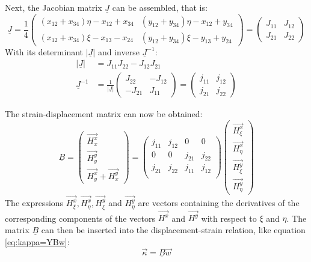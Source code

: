   Next, the Jacobian matrix $\underline{J}$ can be assembled, that is:
  \begin{equation}
  \underline{J} = \frac{1}{4} \begin{pmatrix}
  (x_{12}+x_{34})\eta - x_{12} + x_{34} & (y_{12} + y_{34})\eta - x_{12} + y_{34}\\
  (x_{12}+x_{34})\xi  - x_{13} - x_{24} & (y_{12} + y_{34})\xi  - y_{13} + y_{24}
  \end{pmatrix} = \begin{pmatrix}
  J_{11} & J_{12}\\ J_{21} & J_{22}
  \end{pmatrix}
  \end{equation}
  With its determinant $\left|\underline{J}\right|$ and inverse $\underline{J}^{-1}$:
  \begin{align}
  \left|\underline{J}\right| &= J_{11} J_{22} - J_{12} J_{21}\\
  \underline{J}^{-1} &= \frac{1}{\left|\underline{J}\right|} \begin{pmatrix}
  J_{22} & -J_{12}\\ -J_{21} & J_{11}
  \end{pmatrix} = \begin{pmatrix}
  j_{11} & j_{12}\\ j_{21} & j_{22}
  \end{pmatrix}
  \end{align}
  
  The strain-displacement matrix can now be obtained:
  \begin{equation}
  \underline{B} = \begin{pmatrix}
  \vec{H_x^x}\\\vec{H_y^y}\\\vec{H_y^x}+\vec{H_x^y}
  \end{pmatrix} = \begin{pmatrix}
  j_{11} & j_{12} & 0 & 0\\
  0 & 0 & j_{21} & j_{22}\\
  j_{21} & j_{22} & j_{11} & j_{12}\\
  \end{pmatrix} \begin{pmatrix}
  \vec{H_\xi^x}\\\vec{H_\eta^x}\\\vec{H_\xi^y}\\\vec{H_\eta^y}
  \end{pmatrix}
  \end{equation}
  The expressions $\vec{H_\xi^x}, \vec{H_\eta^x}, \vec{H_\xi^y}$ and $\vec{H_\eta^y}$ are vectors containing the derivatives of the corresponding components of the vectors $\vec{H^x}$ and $\vec{H^y}$ with respect to $\xi$ and $\eta$. The matrix $\underline{B}$ can then be inserted into the displacement-strain relation, like equation \eqref{eq:kappa=YBw}:
  \begin{equation}
  \vec{\kappa} = \underline{B} \vec{w}
  \end{equation}
  
